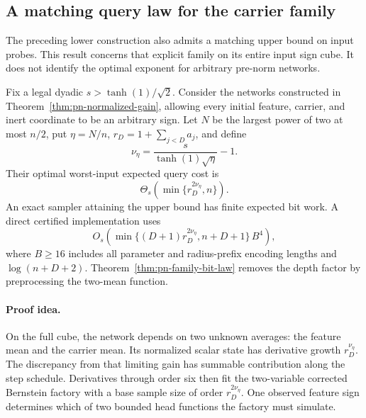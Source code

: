 \subsection{A matching query law for the carrier family}
\label{sec:pn-family-query-law}

The preceding lower construction also admits a matching upper bound
on input probes. This result concerns that explicit family on its
entire input sign cube. It does not identify the optimal exponent
for arbitrary pre-norm networks.

\begin{theorem}
\label{thm:pn-family-query-law}
Fix a legal dyadic $s>\tanh(1)/\sqrt2$. Consider the networks
constructed in Theorem~\ref{thm:pn-normalized-gain}, allowing every
initial feature, carrier, and inert coordinate to be an arbitrary
sign. Let $N$ be the largest power of two at most $n/2$, put
$\eta=N/n$, $r_D=1+\sum_{j<D}a_j$, and define
\[
 \nu_\eta=\frac{s}{\tanh(1)\sqrt\eta}-1.
\]
Their optimal worst-input expected query cost is
\[
 \Theta_s\!\left(\min\{r_D^{2\nu_\eta},n\}\right).
\]
An exact sampler attaining the upper bound has finite expected
bit work. A direct certified implementation uses
\[
 O_s\!\left(
 \min\{(D+1)r_D^{2\nu_\eta},n+D+1\}\,B^4\right),
\]
where $B\ge16$ includes all parameter and radius-prefix encoding
lengths and $\log(n+D+2)$. Theorem~\ref{thm:pn-family-bit-law}
removes the depth factor by preprocessing the two-mean function.
\end{theorem}

\paragraph{Proof idea.}
On the full cube, the network depends on two unknown averages: the
feature mean and the carrier mean. Its normalized scalar state
has derivative growth $r_D^{\nu_\eta}$. The discrepancy from that
limiting gain has summable contribution along the step schedule.
Derivatives through order six then fit the two-variable corrected
Bernstein factory with a base sample size of order
$r_D^{2\nu_\eta}$. One observed feature sign determines which of
two bounded head functions the factory must simulate.

